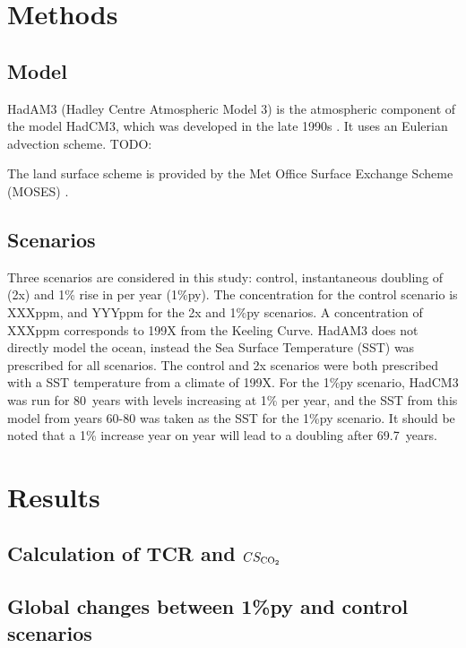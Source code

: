 \documentclass{article}
\begin{document}
\section{Methods}

\subsection{Model}

HadAM3 (Hadley Centre Atmospheric Model 3) is the atmospheric component of the model HadCM3, which was developed in the late 1990s \parencite{pope2000impact}. It uses an Eulerian advection scheme. TODO:

The land surface scheme is provided by the Met Office Surface Exchange Scheme (MOSES) \parencite{cox1999impact}.


\subsection{Scenarios}

Three scenarios are considered in this study: control, instantaneous doubling of  (2x) and 1\% rise in  per year (1\%py). The  concentration for the control scenario is XXXppm, and YYYppm for the 2x and 1\%py scenarios. A concentration of XXXppm corresponds to 199X from the Keeling Curve. HadAM3 does not directly model the ocean, instead the Sea Surface Temperature (SST) was prescribed for all scenarios. The control and 2x scenarios were both prescribed with a SST temperature from a climate of 199X. For the 1\%py scenario, HadCM3 was run for \SI{80}{years} with  levels increasing at 1\% per year, and the SST from this model from years 60-80 was taken as the SST for the 1\%py scenario. It should be noted that a 1\% increase year on year will lead to a doubling after \SI{69.7}{years}.

\newpage
\section{Results}

\subsection{Calculation of TCR and $CS_{\ce{CO2}}$}

\subsection{Global changes between 1\%py and control scenarios}
\end{document}
